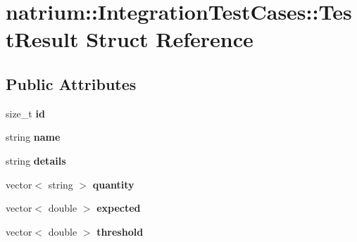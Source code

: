 \hypertarget{structnatrium_1_1IntegrationTestCases_1_1TestResult}{\section{natrium\-:\-:Integration\-Test\-Cases\-:\-:Test\-Result Struct Reference}
\label{structnatrium_1_1IntegrationTestCases_1_1TestResult}
}
\subsection*{Public Attributes}
\begin{DoxyCompactItemize}
\item 
\hypertarget{structnatrium_1_1IntegrationTestCases_1_1TestResult_a30a8d5f69e4e0d7035a0437f3834b34e}{size\-\_\-t {\bfseries id}}\label{structnatrium_1_1IntegrationTestCases_1_1TestResult_a30a8d5f69e4e0d7035a0437f3834b34e}

\item 
\hypertarget{structnatrium_1_1IntegrationTestCases_1_1TestResult_a2a693e3dab3142fb650e7a6510ff89a7}{string {\bfseries name}}\label{structnatrium_1_1IntegrationTestCases_1_1TestResult_a2a693e3dab3142fb650e7a6510ff89a7}

\item 
\hypertarget{structnatrium_1_1IntegrationTestCases_1_1TestResult_af2e7a31b6543fe34f022156030945683}{string {\bfseries details}}\label{structnatrium_1_1IntegrationTestCases_1_1TestResult_af2e7a31b6543fe34f022156030945683}

\item 
\hypertarget{structnatrium_1_1IntegrationTestCases_1_1TestResult_a105402717441e46091e7be8106861f58}{vector$<$ string $>$ {\bfseries quantity}}\label{structnatrium_1_1IntegrationTestCases_1_1TestResult_a105402717441e46091e7be8106861f58}

\item 
\hypertarget{structnatrium_1_1IntegrationTestCases_1_1TestResult_a10182792d7b4027342ab4368bfa44fb6}{vector$<$ double $>$ {\bfseries expected}}\label{structnatrium_1_1IntegrationTestCases_1_1TestResult_a10182792d7b4027342ab4368bfa44fb6}

\item 
\hypertarget{structnatrium_1_1IntegrationTestCases_1_1TestResult_ad69e1b2e302d7b55272e87bc46ca513b}{vector$<$ double $>$ {\bfseries threshold}}\label{structnatrium_1_1IntegrationTestCases_1_1TestResult_ad69e1b2e302d7b55272e87bc46ca513b}


\end{DoxyCompactItemize}
